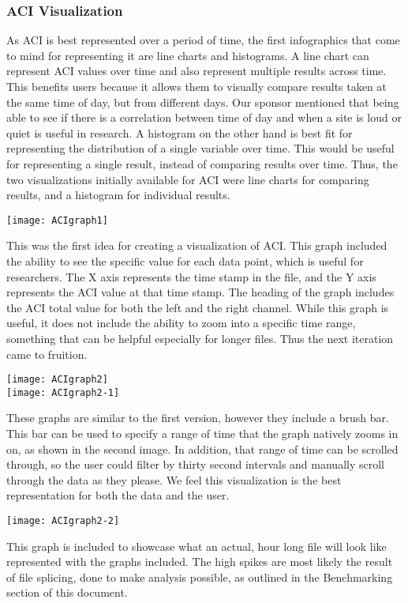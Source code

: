\subsubsection{ACI Visualization}
As ACI is best represented over a period of time, the first infographics that come to mind for representing it are line charts and histograms. A line chart can represent ACI values over time and also represent multiple results across time. This benefits users because it allows them to visually compare results taken at the same time of day, but from different days. Our sponsor mentioned that being able to see if there is a correlation between time of day and when a site is loud or quiet is useful in research. A histogram on the other hand is best fit for representing the distribution of a single variable over time. This would be useful for representing a single result, instead of comparing results over time. Thus, the two visualizations initially available for ACI were line charts for comparing results, and a histogram for individual results.\par

\begin{center}
  \texttt{[image: ACIgraph1]} \\[12pt]
\end{center}
This was the first idea for creating a visualization of ACI. This graph included the ability to see the specific value for each data point, which is useful for researchers. The X axis represents the time stamp in the file, and the Y axis represents the ACI value at that time stamp. The heading of the graph includes the ACI total value for both the left and the right channel. While this graph is useful, it does not include the ability to zoom into a specific time range, something that can be helpful especially for longer files. Thus the next iteration came to fruition.\par

\begin{center}
  \texttt{[image: ACIgraph2]} \\[12pt]
  \texttt{[image: ACIgraph2-1]} \\[12pt]
\end{center}
These graphs are similar to the first version, however they include a brush bar. This bar can be used to specify a range of time that the graph natively zooms in on, as shown in the second image. In addition, that range of time can be scrolled through, so the user could filter by thirty second intervals and manually scroll through the data as they please. We feel this visualization is the best representation for both the data and the user.\par

\begin{center}
  \texttt{[image: ACIgraph2-2]} \\[12pt]
\end{center}
This graph is included to showcase what an actual, hour long file will look like represented with the graphs included. The high spikes are most likely the result of file splicing, done to make analysis possible, as outlined in the Benchmarking section of this document.

